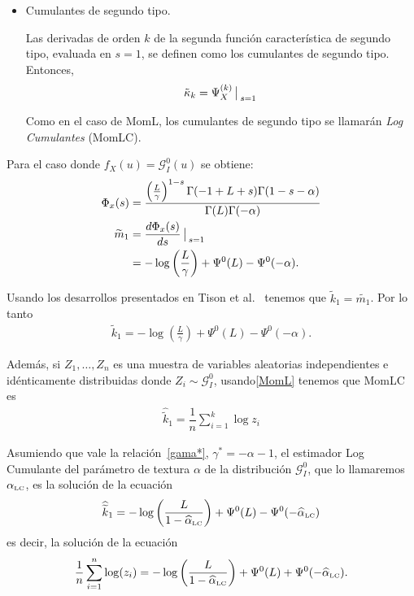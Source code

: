 \begin{itemize}
\item Cumulantes de segundo tipo.

	  Las derivadas de orden $k$ de la segunda función característica de segundo tipo, evaluada en $s=1$, se definen como los cumulantes de segundo tipo. Entonces,
	  \begin{align}
	  \label{CumulanteSegundoTipo}
	  \tilde{\kappa}_k=\Psi_X^{(k)}\big\arrowvert _{s=1}
	  \end{align}
	  
Como en el caso de MomL, los cumulantes de segundo tipo se llamarán \textit{Log Cumulantes} (MomLC).
\end{itemize}

Para el caso donde $f_X(u) = \mathcal{G}_I^0(u)$ se obtiene:
	\begin{align}
	\Phi_x(s) &= \dfrac{\left(\frac{L}{\gamma}\right)^{1-s}\Gamma(-1+L+s)\Gamma(1-s-\alpha)}{\Gamma(L)\Gamma(-\alpha)} \\
	\vspace{1cm}
	\nonumber \widetilde{m}_1 &=  \frac{d \Phi_x(s)}{ds } \big\arrowvert _{s=1}\\
					& = -\log\left(\frac{L}{\gamma}\right) + \Psi^0(L) - \Psi^0(-\alpha).
	\end{align}

Usando los desarrollos presentados en Tison et al.~\cite{Tison2004} tenemos que $\widetilde{k}_1 = \widetilde{m_1}$. Por lo tanto 
\begin{align}
\label{MomLC}
\widetilde{k}_1 =   -\log \left(\frac{L}{\gamma}\right) + \Psi^0(L) - \Psi^0(-\alpha).
\end{align}

Además, si $Z_1,\ldots,Z_n$ es una muestra de variables aleatorias independientes e idénticamente distribuidas donde $Z_i \sim \mathcal{G}_I^0$, usando\eqref{MomL} tenemos que MomLC es
\begin{align}
\label{EstimadorMomLC}
\widehat{\widetilde{k}}_1 =\dfrac{1}{n} \sum_{i=1}^k\log z_i
\end{align}

Asumiendo que vale la relación~\eqref{gama*}, $\gamma^*=-\alpha-1$, el estimador Log Cumulante del parámetro de textura $\alpha$ de la distribución $\mathcal{G}_I^0$, que lo llamaremos $\alpha_{\text{\tiny{LC}}}$, es la solución de la ecuación    
\begin{align}
\widehat{\widetilde{k}}_1 =   -\log \left(\frac{L}{1-\widehat\alpha_{\text{\tiny{LC}}}}\right) + \Psi^0(L) - \Psi^0(-\widehat\alpha_{\text{\tiny{LC}}})
\end{align}
es decir, la solución de la ecuación
\begin{equation} \label{eq:logm}
\frac{1}{n} \sum_{i=1}^n\log (z_i) =   -\log \left(\frac{L}{1-\widehat\alpha_{\text{\tiny{LC}}}}\right) + \Psi^0(L) + \Psi^0(-\widehat\alpha_{\text{\tiny{LC}}}).
\end{equation}


